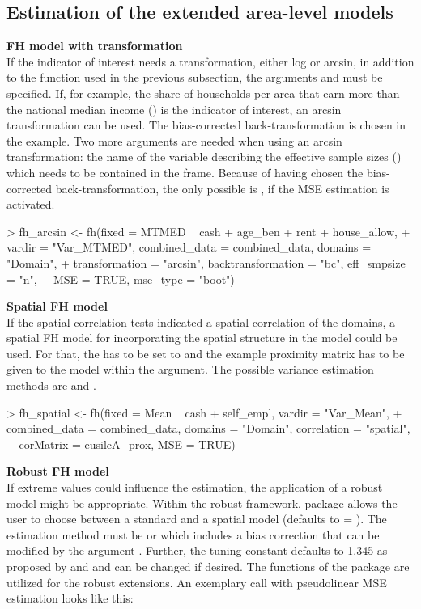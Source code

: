 \subsection{Estimation of the extended area-level models} \label{sec:functionalityext}
\textbf{FH model with transformation} \\
If the indicator of interest needs a transformation, either log or arcsin, in addition to the function used in the previous subsection, the arguments  and  must be specified. If, for example, the share of households per area that earn more than the national median income () is the indicator of interest, an arcsin transformation can be used. The bias-corrected back-transformation  is chosen in the example. Two more arguments are needed when using an arcsin transformation: the name of the variable describing the effective sample sizes () which needs to be contained in the  frame. Because of having chosen the bias-corrected back-transformation, the only possible  is , if the MSE estimation is activated.
\begin{example}
> fh_arcsin <- fh(fixed = MTMED ~ cash + age_ben + rent + house_allow,
+   vardir = "Var_MTMED", combined_data = combined_data, domains = "Domain",
+   transformation = "arcsin", backtransformation = "bc", eff_smpsize = "n",
+   MSE = TRUE, mse_type = "boot")
\end{example}
\textbf{Spatial FH model} \\
If the spatial correlation tests indicated a spatial correlation of the domains, a spatial FH model for incorporating the spatial structure in the model could be used. For that, the  has to be set to  and the example proximity matrix has to be given to the model within the  argument. The possible variance estimation methods are  and .
\begin{example}
> fh_spatial <- fh(fixed = Mean ~ cash + self_empl, vardir = "Var_Mean",
+   combined_data = combined_data, domains = "Domain", correlation = "spatial",
+   corMatrix = eusilcA_prox, MSE = TRUE)
\end{example}
\textbf{Robust FH model} \\
If extreme values could influence the estimation, the application of a robust model might be appropriate. Within the robust framework, package  allows the user to choose between a standard and a spatial model (defaults to  = ). The estimation method must be  or  which includes a bias correction that can be modified by the argument . Further, the tuning constant  defaults to 1.345 as proposed by \citet{Sinha2009} and \citet{Warnholz2016} and can be changed if desired. The functions of the package  are utilized for the robust extensions. An exemplary call with pseudolinear MSE estimation looks like this:
